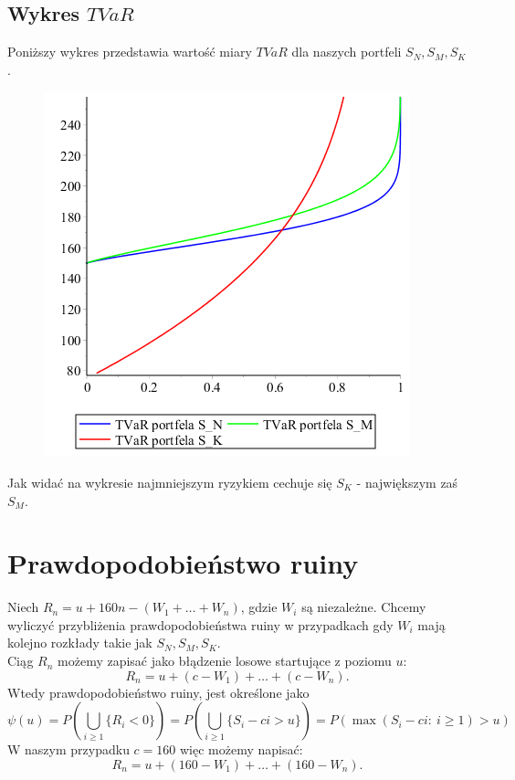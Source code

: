 \documentclass[12pt]{article}
\theoremstyle{twierdzenie}
\theoremstyle{definition}
\begin{document}
\subsection{Wykres $TVaR$}
Poniższy wykres przedstawia wartość miary $TVaR$ dla naszych portfeli $S_N,S_M,S_K$. 
\begin{figure}[H]
\begin{center}
\includegraphics[scale=.7]{tvar2}
\end{center}
\end{figure}
Jak widać na wykresie najmniejszym ryzykiem cechuje się $S_K$ - największym zaś $S_M$.
\newpage
\section{Prawdopodobieństwo ruiny}
Niech $R_n=u+160n-(W_1+\dots+W_n)$, gdzie $W_i$ są niezależne. Chcemy wyliczyć przybliżenia prawdopodobieństwa ruiny w przypadkach gdy $W_i$ mają kolejno rozkłady takie jak $S_N,S_M,S_K$.\\
Ciąg $R_n$ możemy zapisać jako błądzenie losowe startujące z poziomu $u$:
$$R_n=u+(c-W_1)+\dots+(c-W_n).$$
Wtedy prawdopodobieństwo ruiny, jest określone jako
$$\psi(u)=P\left(\bigcup_{i\geq 1}\lbrace R_i<0\rbrace\right)=P\left(\bigcup_{i\geq 1}\lbrace S_i-ci>u\rbrace\right)=P\left(\max (S_i-ci:\ i\geq 1)>u\right)$$
W naszym przypadku $c=160$ więc możemy napisać:
$$R_n=u+(160-W_1)+\dots+(160-W_n).$$
\end{document}
